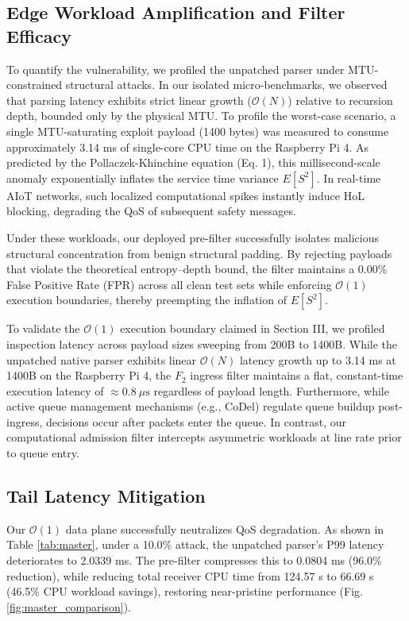 \documentclass[conference]{IEEEtran}
\begin{document}
\subsection{Edge Workload Amplification and Filter Efficacy}
To quantify the vulnerability, we profiled the unpatched parser under MTU-constrained structural attacks. In our isolated micro-benchmarks, we observed that parsing latency exhibits strict linear growth ($\mathcal{O}(N)$) relative to recursion depth, bounded only by the physical MTU. To profile the worst-case scenario, a single MTU-saturating exploit payload (1400 bytes) was measured to consume approximately 3.14 ms of single-core CPU time on the Raspberry Pi 4. As predicted by the Pollaczek-Khinchine equation (Eq. 1), this millisecond-scale anomaly exponentially inflates the service time variance $E[S^2]$. In real-time AIoT networks, such localized computational spikes instantly induce HoL blocking, degrading the QoS of subsequent safety messages.

Under these workloads, our deployed pre-filter successfully isolates malicious structural concentration from benign structural padding. By rejecting payloads that violate the theoretical entropy--depth bound, the filter maintains a 0.00\% False Positive Rate (FPR) across all clean test sets while enforcing $\mathcal{O}(1)$ execution boundaries, thereby preempting the inflation of $E[S^2]$.

To validate the $\mathcal{O}(1)$ execution boundary claimed in Section III, we profiled inspection latency across payload sizes sweeping from 200B to 1400B. While the unpatched native parser exhibits linear $\mathcal{O}(N)$ latency growth up to 3.14 ms at 1400B on the Raspberry Pi 4, the $F_2$ ingress filter maintains a flat, constant-time execution latency of $\approx 0.8~\mu\mathrm{s}$ regardless of payload length. Furthermore, while active queue management mechanisms (e.g., CoDel) regulate queue buildup post-ingress, decisions occur after packets enter the queue. In contrast, our computational admission filter intercepts asymmetric workloads at line rate prior to queue entry.

\subsection{Tail Latency Mitigation}
Our $\mathcal{O}(1)$ data plane successfully neutralizes QoS degradation. As shown in Table \ref{tab:master}, under a 10.0\% attack, the unpatched parser's P99 latency deteriorates to 2.0339 ms. The pre-filter compresses this to 0.0804 ms (96.0\% reduction), while reducing total receiver CPU time from 124.57 s to 66.69 s (46.5\% CPU workload savings), restoring near-pristine performance (Fig. \ref{fig:master_comparison}).
\end{document}
